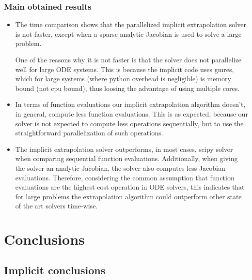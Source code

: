 \documentclass[12pt]{article}
\begin{document}
\subsubsection{Main obtained results}
\begin{itemize}
\item The time comparison shows that the parallelized implicit extrapolation solver is not faster, except when a sparse analytic Jacobian is used to solve a large problem. 

One of the reasons why it is not faster is that the solver does not parallelize well for large ODE systems. This is because the implicit code uses gmres, which for large systems (where python overhead is negligible) is memory bound (not cpu bound), thus loosing the advantage of using multiple cores.

\item In terms of function evaluations our implicit extrapolation algorithm doesn't, in general, compute less function evaluations. This is as expected, because our solver is not expected to compute less operations sequentially, but to use the straightforward parallelization of such operations.

\item The implicit extrapolation solver outperforms, in most cases, scipy solver when comparing sequential function evaluations. Additionally, when giving the solver an analytic Jacobian, the solver also computes less Jacobian evaluations. Therefore, considering the common assumption that function evaluations are the highest cost operation in ODE solvers, this indicates that for large problems the extrapolation algorithm could outperform other state of the art solvers time-wise.

\end{itemize}

\section{Conclusions}

\subsection{Implicit conclusions}
\end{document}
